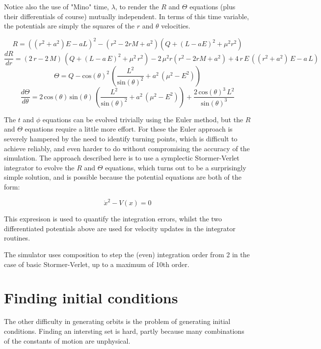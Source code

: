 \documentclass[11pt]{article}
\begin{document}
Notice also the use of "Mino" time, $\lambda$, to render the $R$ and $\Theta$ equations (plus their differentials of course) mutually independent.  In terms of this time variable, the potentials are simply the squares of the $r$ and $\theta$ velocities.


$$
R = ((r^2 + a^2) E - aL)^2 - (r^2 - 2rM  + a^{2}) ( Q+{\left( L - aE\right) }^{2}+{\mu}^{2}{r}^{2})
$$
$$
\frac{d R}{d r} = \left( 2\,r - 2\,M\right) \,\left( Q+{\left( L - a\,E\right) }^{2}+{\mu}^{2}\,{r}^{2}\right) - 2\,{\mu}^{2}r({r}^{2} - 2rM  + {a}^{2}) +4\,r\,E\,\left( \left( {r}^{2}+{a}^{2}\right) \,E - a\,L\right)
$$
$$
\Theta=Q - {\mathrm{cos}\left( \theta\right) }^{2}\,\left( \frac{{L}^{2}}{{\mathrm{sin}\left( \theta\right) }^{2}}+{a}^{2}\,\left( {\mu}^{2} - {E}^{2}\right) \right)
$$
$$
\frac{d \Theta}{d \theta} = 2\,\mathrm{cos}\left( \theta\right) \,\mathrm{sin}\left( \theta\right) \,\left( \frac{{L}^{2}}{{\mathrm{sin}\left( \theta\right) }^{2}}+{a}^{2}\,\left( {\mu}^{2} - {E}^{2}\right) \right) +\frac{2\,{\mathrm{cos}\left( \theta\right) }^{3}\,{L}^{2}}{{\mathrm{sin}\left( \theta\right) }^{3}}
$$

The $t$ and $\phi$ equations can be evolved trivially using the Euler method, but the $R$ and $\Theta$ equations require a little more effort.  For these the Euler approach is severely hampered by the need to identify turning points, which is difficult to achieve reliably, and even harder to do without compromising the accuracy of the simulation.  The approach described here is to use a symplectic Stormer-Verlet integrator \cite{hairer} to evolve the $R$ and $\Theta$ equations, which turns out to be a surprisingly simple solution, and is possible because the potential equations are both of the form:

$$
\dot x^2 - V(x) = 0
$$

This expresison is used to quantify the integration errors, whilst the two differentiated potentials above are used for velocity updates in the integrator routines.

The simulator uses composition to step the (even) integration order from 2 in the case of basic Stormer-Verlet, up to a maximum of 10th order.

\section{Finding initial conditions}

The other difficulty in generating orbits is the problem of generating initial conditions.  Finding an intersting set is hard, partly because many combinations of the constants of motion are unphysical.
\end{document}
